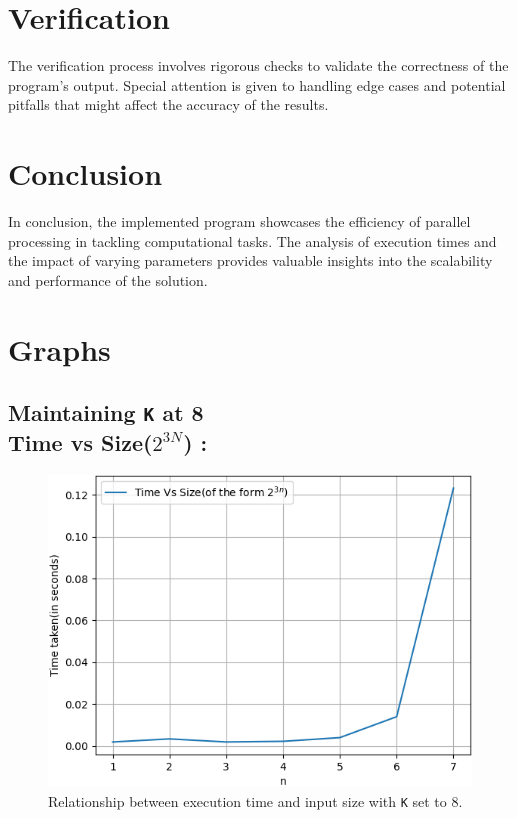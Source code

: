 \documentclass{article}
\begin{document}
\section{Verification}
{\large
The verification process involves rigorous checks to validate the correctness of the program's output. Special attention is given to handling edge cases and potential pitfalls that might affect the accuracy of the results.

\section{Conclusion}
{\large
In conclusion, the implemented program showcases the efficiency of parallel processing in tackling computational tasks. The analysis of execution times and the impact of varying parameters provides valuable insights into the scalability and performance of the solution.

\section{Graphs}
\subsection{Maintaining \texttt{K} at 8\\Time vs Size($2^{3N}$) :}
\begin{figure}[H]
  \centering
  \includegraphics[width=0.6\linewidth]{1.png}
  \caption{Relationship between execution time and input size with \texttt{K} set to 8.}
  \label{fig:graph1}
\end{figure}

}}
\end{document}
